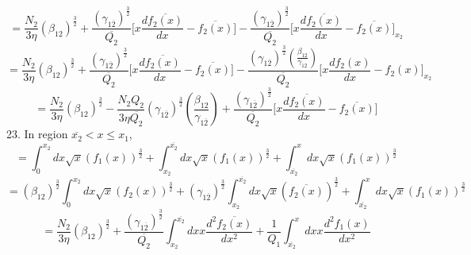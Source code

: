 \documentclass[fleqn, 10pt]{article}
\begin{document}
                \begin{equation*}
                    = \frac{N_{2}}{3 \eta} (\beta_{12})^\frac{3}{2} + \frac{(\gamma_{1\overline{2}})^\frac{3}{2}}{\overline{Q_{2}}} \biggl[ x \frac{d\overline{f_{2}(x)}}{dx} - \overline{f_{2}(x)} \biggr] - \frac{(\gamma_{1\overline{2}})^\frac{3}{2}}{\overline{Q_{2}}} \biggl[ x \frac{d\overline{f_{2}(x)}}{dx} - \overline{f_{2}(x)} \biggr]_{x_{2}}
                \end{equation*}
                \begin{equation*}
                    = \frac{N_{2}}{3 \eta} (\beta_{12})^\frac{3}{2} + \frac{(\gamma_{1\overline{2}})^\frac{3}{2}}{\overline{Q_{2}}} \biggl[ x \frac{d\overline{f_{2}(x)}}{dx} - \overline{f_{2}(x)} \biggr] - \frac{(\gamma_{1\overline{2}})^\frac{3}{2}\left(\frac{\beta_{12}}{\gamma_{1\overline{2}}}\right)}{\overline{Q_{2}}} \biggl[ x \frac{df_{2}(x)}{dx} - f_{2}(x) \biggr]_{x_{2}}
                \end{equation*}
                \begin{equation}
                    = \frac{N_{2}}{3 \eta} (\beta_{12})^\frac{3}{2} - \frac{N_{2} Q_{2}}{3 \eta \overline{Q_{2}}} (\gamma_{1\overline{2}})^\frac{3}{2} \left(\frac{\beta_{12}}{\gamma_{1\overline{2}}}\right) + \frac{(\gamma_{1\overline{2}})^\frac{3}{2}}{\overline{Q_{2}}} \biggl[ x \frac{d\overline{f_{2}(x)}}{dx} - \overline{f_{2}(x)} \biggr]
                    \label{107}
                \end{equation}
                23. 
                 In region $\overline{x_{2}}<x\leq x_1$, 
      \begin{equation*}
          = \int^{x_{2}}_0 dx \sqrt{x} (f_1(x))^\frac{3}{2} + \int^{\overline{x_{2}}}_{x_{2}} dx \sqrt{x} (f_1(x))^\frac{3}{2} + \int^{x}_{\overline{x_{2}}} dx \sqrt{x} (f_1(x))^\frac{3}{2}
      \end{equation*}
      \begin{equation*}
          = (\beta_{12})^\frac{3}{2} \int^{x_{2}}_0 dx \sqrt{x} (f_{2}(x))^\frac{3}{2} + (\gamma_{1\overline{2}})^\frac{3}{2} \int^{\overline{x_{2}}}_{x_{2}} dx \sqrt{x} (\overline{f_{2}(x)})^\frac{3}{2} + \int^{x}_{\overline{x_{2}}} dx \sqrt{x} (f_1(x))^\frac{3}{2} 
      \end{equation*}
      \begin{equation*}
          = \frac{N_{2}}{3 \eta} (\beta_{12})^\frac{3}{2} + \frac{(\gamma_{1\overline{2}})^\frac{3}{2}}{\overline{Q_{2}}} \int^{\overline{x_{2}}}_{x_{2}} dx x \frac{d^2\overline{f_{2}(x)}}{dx^2} + \frac{1}{Q_1} \int^{x}_{\overline{x_{2}}} dx x \frac{d^2f_1(x)}{dx^2}
      \end{equation*}
\end{document}
